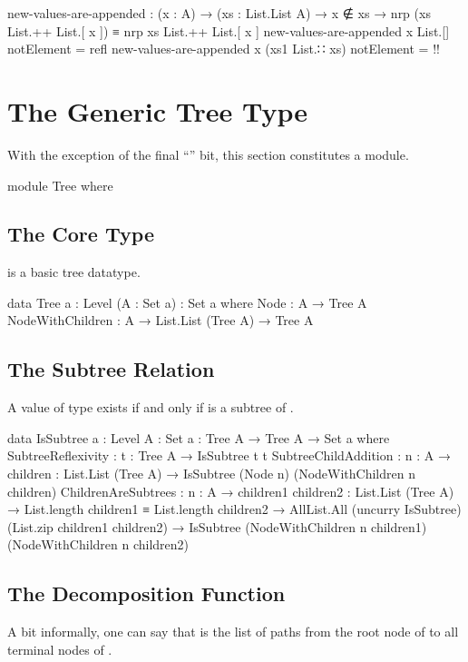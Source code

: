 \documentclass{report}
\begin{document}
\begin{code}
  new-values-are-appended :
    (x : A) →
    (xs : List.List A) →
    x ∉ xs →
    nrp (xs List.++ List.[ x ]) ≡ nrp xs List.++ List.[ x ]
  new-values-are-appended x List.[] notElement = refl
  new-values-are-appended x (xs1 List.∷ xs) notElement = {!!}
\end{code}

\chapter{The Generic Tree Type}
With the exception of the final ``'' bit, this section constitutes a module.

\begin{code}
module Tree where
\end{code}

\section{The Core Type}
 is a basic tree datatype.

\begin{code}
  data Tree {a : Level} (A : Set a) : Set a
    where
    Node : A → Tree A
    NodeWithChildren : A → List.List (Tree A) → Tree A
\end{code}

\section{The Subtree Relation}
A value of type    exists if and only if  is a subtree of .

\begin{code}
  data IsSubtree {a : Level} {A : Set a} : Tree A → Tree A → Set a
    where
    SubtreeReflexivity : {t : Tree A} → IsSubtree t t
    SubtreeChildAddition :
      {n : A} →
      {children : List.List (Tree A)} →
      IsSubtree (Node n) (NodeWithChildren n children)
    ChildrenAreSubtrees :
      {n : A} →
      {children1 children2 : List.List (Tree A)} →
      List.length children1 ≡ List.length children2 →
      AllList.All (uncurry IsSubtree) (List.zip children1 children2) →
      IsSubtree (NodeWithChildren n children1)
                (NodeWithChildren n children2)
\end{code}

\section{The Decomposition Function}
A bit informally, one can say that   is the list of paths from the root node of  to all terminal nodes of .
\end{document}
